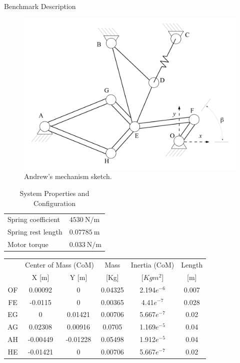 \documentclass[final]{beamer}
\newlength{\onecolwid}
\newlength{\twocolwid}
\begin{document}
\begin{frame}[t]
\begin{columns}[t]
\begin{column}{\twocolwid}
\begin{columns}[t, totalwidth=\twocolwid]
\begin{column}{\onecolwid}
\begin{block}{Benchmark Description}
\end{block}


\begin{figure}
\includegraphics[width=0.8\linewidth]{3MBS_Andrew.pdf}
\caption{Andrew's mechanism sketch.}
\label{FIG:AndrewMechanism}
\end{figure}


\begin{table}
\vspace{2ex}
\begin{tabular}{ll}
\toprule
Spring coefficient & $\SI{4530}{\newton / \metre}$\\
Spring rest length & $\SI{0.07785}{\metre}$\\
Motor torque & $\SI{0.033}{\newton \per \metre}$\\
\bottomrule
\end{tabular}
 \label{TAB:SystemProperties}
\caption{System Properties and Configuration}
\end{table}



\begin{table}[h]
\centering
	\label{TAB:RodsProperties}	
	\begin{tabular}[b]{cccccc}
		\toprule
			& \multicolumn{2}{c}{Center of Mass (CoM)} & Mass & Inertia (CoM) & Length \\
			&	X [m]	&	Y [m]	&	[Kg]	&	[$Kg m^2$]	&	[m]	\\
		\midrule		
		OF	&	0.00092	&	0	&	0.04325	&	2.194$e^{-6}$	&	0.007	\\
		FE	&	-0.0115	&	0	&	0.00365	&	4.41$e^{-7}$	&	0.028	\\
		EG	&	0	&	0.01421	&	0.00706	&	5.667$e^{-7}$	&	0.02	\\
		AG	&	0.02308	&	0.00916	&	0.0705	&	1.169$e^{-5}$	&	0.04	\\
		AH	&	-0.00449	&	-0.01228	&	0.05498	&	1.912$e^{-5}$	&	0.04	\\
		HE	&	-0.01421	&	0	&	0.00706	&	5.667$e^{-7}$	&	0.02	\\
		\bottomrule
	\end{tabular}
	

\end{table}
\end{column}
\end{columns}
\end{column}
\end{columns}
\end{frame}
\end{document}
